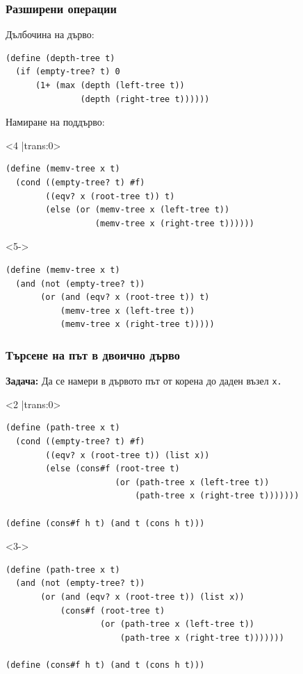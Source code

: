 \documentclass[alsotrans,beameroptions={aspectratio=169}]{beamerswitch}
\begin{document}
\begin{frame}[fragile]
  \frametitle{Разширени операции}

  Дълбочина на дърво:
  \pause
\begin{lstlisting}
(define (depth-tree t)
  (if (empty-tree? t) 0
      (1+ (max (depth (left-tree t))
               (depth (right-tree t))))))
\end{lstlisting}
\pause
  Намиране на поддърво:
  \pause

  \begin{fixedarea}[.4]
    \begin{onlyenv}<4 |trans:0>
\begin{lstlisting}
(define (memv-tree x t)
  (cond ((empty-tree? t) #f)
        ((eqv? x (root-tree t)) t)
        (else (or (memv-tree x (left-tree t))
                  (memv-tree x (right-tree t))))))
\end{lstlisting}
    \end{onlyenv}
    \begin{onlyenv}<5->
\begin{lstlisting}
(define (memv-tree x t)
  (and (not (empty-tree? t))
       (or (and (eqv? x (root-tree t)) t)
           (memv-tree x (left-tree t))
           (memv-tree x (right-tree t)))))
\end{lstlisting}
    \end{onlyenv}
  \end{fixedarea}
\end{frame}

\begin{frame}[fragile]
  \frametitle{Търсене на път в двоично дърво}

  \textbf{Задача:} Да се намери в дървото път от корена до даден възел \tt x.
  \pause
  \begin{fixedarea}[.7]
  \begin{onlyenv}<2 |trans:0>
\begin{lstlisting}
(define (path-tree x t)
  (cond ((empty-tree? t) #f)
        ((eqv? x (root-tree t)) (list x))
        (else (cons#f (root-tree t)
                      (or (path-tree x (left-tree t))
                          (path-tree x (right-tree t)))))))

(define (cons#f h t) (and t (cons h t)))
\end{lstlisting}
  \end{onlyenv}
  \begin{onlyenv}<3->
\begin{lstlisting}
(define (path-tree x t)
  (and (not (empty-tree? t))
       (or (and (eqv? x (root-tree t)) (list x))
           (cons#f (root-tree t)
                   (or (path-tree x (left-tree t))
                       (path-tree x (right-tree t)))))))

(define (cons#f h t) (and t (cons h t)))
\end{lstlisting}
  \end{onlyenv}
\end{fixedarea}
\end{frame}
\end{document}
